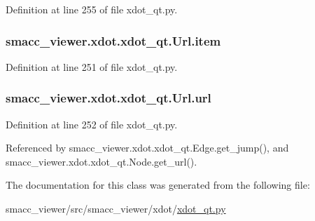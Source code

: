 Definition at line 255 of file xdot\+\_\+qt.\+py.

\subsubsection[{\texorpdfstring{item}{item}}]{\setlength{\rightskip}{0pt plus 5cm}smacc\+\_\+viewer.\+xdot.\+xdot\+\_\+qt.\+Url.\+item}\hypertarget{classsmacc__viewer_1_1xdot_1_1xdot__qt_1_1Url_a53a5d1f937d3af9ea0ea13ca416961db}{}\label{classsmacc__viewer_1_1xdot_1_1xdot__qt_1_1Url_a53a5d1f937d3af9ea0ea13ca416961db}


Definition at line 251 of file xdot\+\_\+qt.\+py.

\subsubsection[{\texorpdfstring{url}{url}}]{\setlength{\rightskip}{0pt plus 5cm}smacc\+\_\+viewer.\+xdot.\+xdot\+\_\+qt.\+Url.\+url}\hypertarget{classsmacc__viewer_1_1xdot_1_1xdot__qt_1_1Url_a0bdfbec6ad0015937a0965e53f8728ad}{}\label{classsmacc__viewer_1_1xdot_1_1xdot__qt_1_1Url_a0bdfbec6ad0015937a0965e53f8728ad}


Definition at line 252 of file xdot\+\_\+qt.\+py.



Referenced by smacc\+\_\+viewer.\+xdot.\+xdot\+\_\+qt.\+Edge.\+get\+\_\+jump(), and smacc\+\_\+viewer.\+xdot.\+xdot\+\_\+qt.\+Node.\+get\+\_\+url().



The documentation for this class was generated from the following file\+:\begin{DoxyCompactItemize}
\item 
smacc\+\_\+viewer/src/smacc\+\_\+viewer/xdot/\hyperlink{xdot__qt_8py}{xdot\+\_\+qt.\+py}\end{DoxyCompactItemize}
